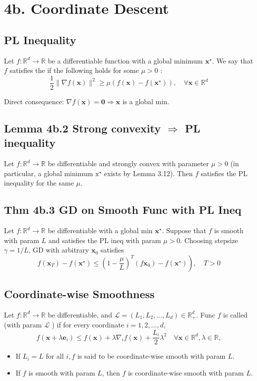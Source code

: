\section*{4b. Coordinate Descent}
\subsection*{PL Inequality}
Let $f: \mathbb{R}^{d} \rightarrow \mathbb{R}$ be a differentiable function with a global minimum $\mathbf{x}^{\star}$. We say that $f$ satisfies the  if the following holds for some $\mu>0$ :
$$
\frac{1}{2}\|\nabla f(\mathbf{x})\|^{2} \geq \mu\left(f(\mathbf{x})-f\left(\mathbf{x}^{\star}\right)\right), \quad \forall \mathbf{x} \in \mathbb{R}^{d}
$$

Direct consequence: $\nabla f(\mathbf{x})=\mathbf{0} \Rightarrow \mathbf{x}$ is a global min.


\subsection*{Lemma 4b.2 Strong convexity $\Rightarrow$ PL inequality}
Let $f: \mathbb{R}^{d} \rightarrow \mathbb{R}$ be differentiable and strongly convex with parameter $\mu>0$ (in particular, a global minimum $\mathrm{x}^{\star}$ exists by Lemma 3.12). Then $f$ satisfies the PL inequality for the same $\mu$.



\subsection*{Thm 4b.3 GD on Smooth Func with PL Ineq}
Let $f: \mathbb{R}^{d} \rightarrow \mathbb{R}$ be differentiable with a global min $\mathbf{x}^{\star}$. Suppose that $f$ is smooth with param $L$ and satisfies the PL ineq with param $\mu>0$. Choosing stepsize $\gamma=1 / L$, GD with arbitrary $\mathbf{x}_{0}$ satisfies
$$
\left.f\left(\mathbf{x}_{T}\right)-f\left(\mathbf{x}^{\star}\right) \leq\left(1-\frac{\mu}{L}\right)^{T}\left(f \mathbf{x}_{0}\right)-f\left(\mathbf{x}^{\star}\right)\right), \quad T>0
$$



\subsection*{Coordinate-wise Smoothness}
Let $f: \mathbb{R}^{d} \rightarrow \mathbb{R}$ be differentiable, and $\mathcal{L}=\left(L_{1}, L_{2}, \ldots, L_{d}\right) \in \mathbb{R}_{+}^{d}$. Func $f$ is called  (with param $\mathcal{L}$ ) if for every coordinate $i=1,2, \ldots, d$,
$$
f\left(\mathbf{x}+\lambda \mathbf{e}_{i}\right) \leq f(\mathbf{x})+\lambda \nabla_{i} f(\mathbf{x})+\frac{L_{i}}{2} \lambda^{2} \quad \forall \mathbf{x} \in \mathbb{R}^{d}, \lambda \in \mathbb{R},
$$
\begin{itemize}[leftmargin=*]
    \item If $L_{i}=L$ for all $i, f$ is said to be coordinate-wise smooth with param $L$.
    \item If $f$ is smooth with param $L$, then $f$ is coordinate-wise smooth with param $L$.
\end{itemize}




